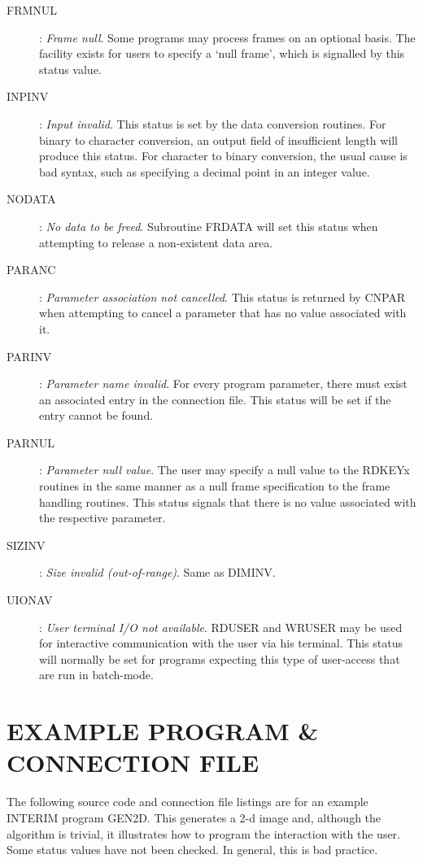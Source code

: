 \documentclass{article}
\begin{document}
\begin{description}
\item [FRMNUL]:
{\em Frame null}.
Some programs may process frames on an optional basis.
The facility exists for users to specify a `null frame', which is signalled by
this status value.
\item [INPINV]:
{\em Input invalid}.
This status is set by the data conversion routines.
For binary to character conversion, an output field of insufficient length will
produce this status.
For character to binary conversion, the usual cause is bad syntax, such as
specifying a decimal point in an integer value.
\item [NODATA]:
{\em No data to be freed}.
Subroutine FRDATA will set this status when attempting to release a non-existent
data area.
\item [PARANC]:
{\em Parameter association not cancelled}.
This status is returned by CNPAR when attempting to cancel a parameter that has
no value associated with it.
\item [PARINV]:
{\em Parameter name invalid}.
For every program parameter, there must exist an associated entry in the
connection file.
This status will be set if the entry cannot be found.
\item [PARNUL]:
{\em Parameter null value}.
The user may specify a null value to the RDKEYx routines in the same manner as a
null frame specification to the frame handling routines.
This status signals that there is no value associated with the respective
parameter.
\item [SIZINV]:
{\em Size invalid (out-of-range)}.
Same as DIMINV.
\item [UIONAV]:
{\em User terminal I/O not available}.
RDUSER and WRUSER may be used for interactive communication with the user via
his terminal.
This status will normally be set for programs expecting this type of
user-access that are run in batch-mode.
\end{description}
\section {EXAMPLE PROGRAM \& CONNECTION FILE}
The following source code and connection file listings are for an example
INTERIM program GEN2D.
This generates a 2-d image and, although the algorithm is trivial, it
illustrates how to program the interaction with the user.
Some status values have not been checked.
In general, this is bad practice.
\end{document}
